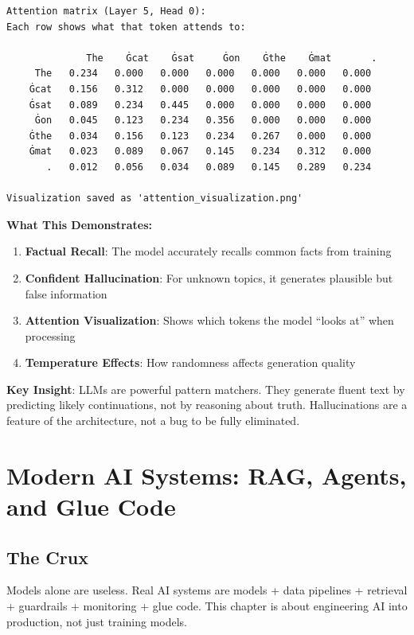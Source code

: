 \documentclass[11pt,oneside]{book}
\newcommand{\blankpage}{%
    \clearpage
    \thispagestyle{empty}
    \mbox{}
    \clearpage
}
\begin{document}
\begin{verbatim}
Attention matrix (Layer 5, Head 0):
Each row shows what that token attends to:

              The    Ġcat    Ġsat     Ġon    Ġthe    Ġmat       .
     The   0.234   0.000   0.000   0.000   0.000   0.000   0.000
    Ġcat   0.156   0.312   0.000   0.000   0.000   0.000   0.000
    Ġsat   0.089   0.234   0.445   0.000   0.000   0.000   0.000
     Ġon   0.045   0.123   0.234   0.356   0.000   0.000   0.000
    Ġthe   0.034   0.156   0.123   0.234   0.267   0.000   0.000
    Ġmat   0.023   0.089   0.067   0.145   0.234   0.312   0.000
       .   0.012   0.056   0.034   0.089   0.145   0.289   0.234

Visualization saved as 'attention_visualization.png'
\end{verbatim}

\textbf{What This Demonstrates:}

\begin{enumerate}
\item \textbf{Factual Recall}: The model accurately recalls common facts from training
\item \textbf{Confident Hallucination}: For unknown topics, it generates plausible but false information
\item \textbf{Attention Visualization}: Shows which tokens the model ``looks at'' when processing
\item \textbf{Temperature Effects}: How randomness affects generation quality
\end{enumerate}

\textbf{Key Insight}: LLMs are powerful pattern matchers. They generate fluent text by predicting likely continuations, not by reasoning about truth. Hallucinations are a feature of the architecture, not a bug to be fully eliminated.

\blankpage


\chapter{Modern AI Systems: RAG, Agents, and Glue Code}

\section{The Crux}
Models alone are useless. Real AI systems are models + data pipelines + retrieval + guardrails + monitoring + glue code. This chapter is about engineering AI into production, not just training models.
\end{document}
